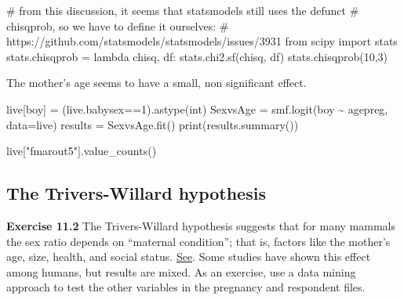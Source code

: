 \documentclass[
  letterpaper,
  DIV=11,
  numbers=noendperiod]{scrreprt}
\newenvironment{Shaded}{\begin{snugshade}}{\end{snugshade}}
\newcommand{\BuiltInTok}[1]{\textcolor[rgb]{0.00,0.23,0.31}{#1}}
\newcommand{\CommentTok}[1]{\textcolor[rgb]{0.37,0.37,0.37}{#1}}
\newcommand{\DecValTok}[1]{\textcolor[rgb]{0.68,0.00,0.00}{#1}}
\newcommand{\ImportTok}[1]{\textcolor[rgb]{0.00,0.46,0.62}{#1}}
\newcommand{\KeywordTok}[1]{\textcolor[rgb]{0.00,0.23,0.31}{#1}}
\newcommand{\NormalTok}[1]{\textcolor[rgb]{0.00,0.23,0.31}{#1}}
\newcommand{\OperatorTok}[1]{\textcolor[rgb]{0.37,0.37,0.37}{#1}}
\newcommand{\StringTok}[1]{\textcolor[rgb]{0.13,0.47,0.30}{#1}}
\begin{document}
\begin{Shaded}
\begin{Highlighting}[]
\CommentTok{\# from this discussion, it seems that statsmodels still uses the defunct}
\CommentTok{\# chisqprob, so we have to define it ourselves:}
\CommentTok{\# https://github.com/statsmodels/statsmodels/issues/3931}
\ImportTok{from}\NormalTok{ scipy }\ImportTok{import}\NormalTok{ stats}
\NormalTok{stats.chisqprob }\OperatorTok{=} \KeywordTok{lambda}\NormalTok{ chisq, df: stats.chi2.sf(chisq, df)}
\NormalTok{stats.chisqprob(}\DecValTok{10}\NormalTok{,}\DecValTok{3}\NormalTok{)}
\end{Highlighting}
\end{Shaded}

The mother's age seems to have a small, non significant effect.

\begin{Shaded}
\begin{Highlighting}[]
\NormalTok{live[}\StringTok{\textquotesingle{}boy\textquotesingle{}}\NormalTok{] }\OperatorTok{=}\NormalTok{ (live.babysex}\OperatorTok{==}\DecValTok{1}\NormalTok{).astype(}\BuiltInTok{int}\NormalTok{)}
\NormalTok{SexvsAge }\OperatorTok{=}\NormalTok{ smf.logit(}\StringTok{\textquotesingle{}boy \textasciitilde{} agepreg\textquotesingle{}}\NormalTok{, data}\OperatorTok{=}\NormalTok{live)}
\NormalTok{results }\OperatorTok{=}\NormalTok{ SexvsAge.fit()}
\BuiltInTok{print}\NormalTok{(results.summary())}
\end{Highlighting}
\end{Shaded}

\begin{Shaded}
\begin{Highlighting}[]
\NormalTok{live[}\StringTok{"fmarout5"}\NormalTok{].value\_counts()}
\end{Highlighting}
\end{Shaded}

\hypertarget{the-trivers-willard-hypothesis}{%
\subsection{The Trivers-Willard
hypothesis}\label{the-trivers-willard-hypothesis}}

\textbf{Exercise 11.2} The Trivers-Willard hypothesis suggests that for
many mammals the sex ratio depends on ``maternal condition''; that is,
factors like the mother's age, size, health, and social status.
\href{https://en.wikipedia.org/wiki/Trivers-Willard_hypothesis}{See}.
Some studies have shown this effect among humans, but results are mixed.
As an exercise, use a data mining approach to test the other variables
in the pregnancy and respondent files.
\end{document}
